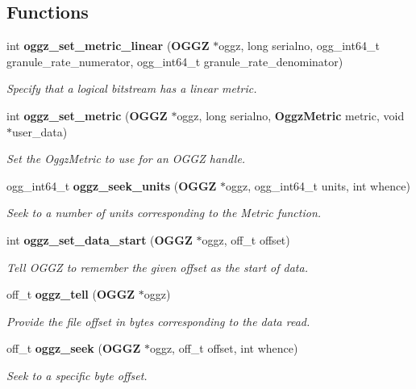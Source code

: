 \subsection*{Functions}
\begin{CompactItemize}
\item 
int {\bf oggz\_\-set\_\-metric\_\-linear} ({\bf OGGZ} $\ast$oggz, long serialno, ogg\_\-int64\_\-t granule\_\-rate\_\-numerator, ogg\_\-int64\_\-t granule\_\-rate\_\-denominator)
\begin{CompactList}\small\item\em Specify that a logical bitstream has a linear metric. \item\end{CompactList}\item 
int {\bf oggz\_\-set\_\-metric} ({\bf OGGZ} $\ast$oggz, long serialno, {\bf Oggz\-Metric} metric, void $\ast$user\_\-data)
\begin{CompactList}\small\item\em Set the Oggz\-Metric to use for an OGGZ handle. \item\end{CompactList}\item 
ogg\_\-int64\_\-t {\bf oggz\_\-seek\_\-units} ({\bf OGGZ} $\ast$oggz, ogg\_\-int64\_\-t units, int whence)
\begin{CompactList}\small\item\em Seek to a number of units corresponding to the Metric function. \item\end{CompactList}\item 
int {\bf oggz\_\-set\_\-data\_\-start} ({\bf OGGZ} $\ast$oggz, off\_\-t offset)
\begin{CompactList}\small\item\em Tell OGGZ to remember the given offset as the start of data. \item\end{CompactList}\item 
off\_\-t {\bf oggz\_\-tell} ({\bf OGGZ} $\ast$oggz)
\begin{CompactList}\small\item\em Provide the file offset in bytes corresponding to the data read. \item\end{CompactList}\item 
off\_\-t {\bf oggz\_\-seek} ({\bf OGGZ} $\ast$oggz, off\_\-t offset, int whence)
\begin{CompactList}\small\item\em Seek to a specific byte offset. \item\end{CompactList}\end{CompactItemize}


